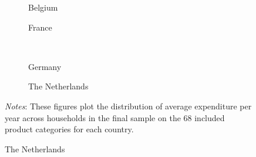 \begin{figure}[H]
   \centering
   \caption{Expenditure per year}
   \label{fig: app_data_households_exp_year}
   \begin{subfigure}[t]{.49\textwidth}
		\centering
        \caption{Belgium}
        \scalebox{0.45}{}
    \end{subfigure}
    \begin{subfigure}[t]{.49\textwidth}
		\centering
        \caption{France}
        \scalebox{0.45}{}
    \end{subfigure}\\
    \begin{subfigure}[t]{.49\textwidth}
		\centering
        \caption{Germany}
        \scalebox{0.45}{}
    \end{subfigure}
    \begin{subfigure}[t]{.49\textwidth}
		\centering
        \caption{The Netherlands}
        \scalebox{0.45}{}
    \end{subfigure}
    \parbox{\textwidth}{
        \begin{spacing}{1} 
            {\footnotesize 
            \textit{Notes}: These figures plot the distribution of average expenditure per year across households in the final sample on the 68 included product categories for each country.}
        \end{spacing}}
\end{figure} 

